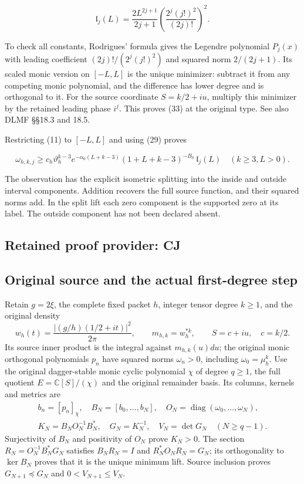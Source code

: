 \documentclass[11pt,a4paper]{article}
\newcommand{\C}{\mathbb C}
\begin{document}
\[
 \mathfrak l_j(L)=
 \frac{2L^{2j+1}}{2j+1}
       \left(\frac{2^j(j!)^2}{(2j)!}\right)^2.                           \tag{33}
\]

To check all constants, Rodrigues' formula gives the Legendre polynomial
\(P_j(x)\) with leading coefficient \((2j)!/(2^j(j!)^2)\) and squared
norm \(2/(2j+1)\). Its scaled monic version on \([-L,L]\) is the unique
minimizer: subtract it from any competing monic polynomial, and the
difference has lower degree and is orthogonal to it. For the source
coordinate \(S=k/2+iu\), multiply this minimizer by the retained leading
phase \(i^j\). This proves (33) at the original type. See also DLMF
§§18.3 and 18.5.

Restricting (11) to \([-L,L]\) and using (29) proves

\[
 \boxed{
 \omega_{h,k,j}\ge
 c_h\vartheta_h^{k-3}
 e^{-\alpha_0(L+k-3)}(1+L+k-3)^{-B_h}\,\mathfrak l_j(L)
 \quad(k\ge3,L>0).}                                                    \tag{34}
\]

The observation has the explicit isometric splitting into the inside and
outside interval components. Addition recovers the full source function,
and their squared norms add. In the split lift each zero component is
the supported zero at its label. The outside component has not been
declared absent.



\clearpage
\subsection*{Retained proof provider: CJ}

\subsection{Original source and the actual first-degree step}

Retain $g=2\xi$, the complete fixed packet $h$, integer tensor degree $k\ge1$,
and the original density
\[
 w_h(t)=\frac{|(g/h)(1/2+it)|^2}{2\pi},\qquad
 m_{h,k}=w_h^{*k},\qquad S=c+iu,\quad c=k/2.
 \tag{CJ.1}
\]
Its source inner product is the integral against $m_{h,k}(u)du$;
the original monic orthogonal polynomials $p_n$ have squared norms
$\omega_n>0$, including $\omega_0=\mu_h^k$.
Use the original dagger-stable monic cyclic polynomial $\chi$ of
degree $q\ge1$, the full quotient $E=\C[S]/(\chi)$ and the
original remainder basis. Its columns, kernels and metrics are
\[
 \begin{gathered}
 b_n=[p_n]_\chi,\quad B_N=[b_0,\ldots,b_N],\quad
 O_N=\operatorname{diag}(\omega_0,\ldots,\omega_N),\quad
 \\
 K_N=B_NO_N^{-1}B_N^*,\quad G_N=K_N^{-1},\quad V_N=\det G_N
 \quad(N\ge q-1).
 \end{gathered}
 \tag{CJ.2}
\]
Surjectivity of $B_N$ and positivity of $O_N$ prove $K_N>0$.
The section $R_N=O_N^{-1}B_N^*G_N$ satisfies $B_NR_N=I$ and
$R_N^*O_NR_N=G_N$; its orthogonality to $\ker B_N$ proves
that it is the unique minimum lift. Source inclusion proves
$G_{N+1}\preceq G_N$ and $0<V_{N+1}\le V_N$.
\end{document}
